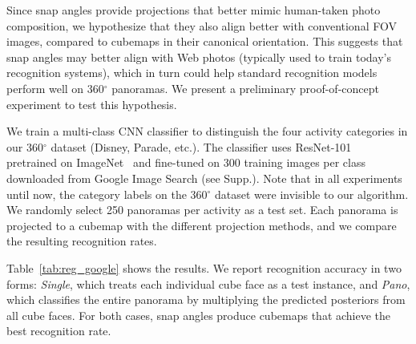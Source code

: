 Since snap angles provide projections that better mimic human-taken photo composition, we hypothesize that they also align better with conventional FOV images, compared to cubemaps in their canonical orientation.  This suggests that snap angles may better align with Web photos (typically used to train today's recognition systems), which in turn could help standard recognition models perform well on 360$^{\circ}$ panoramas.  We present a preliminary proof-of-concept experiment to test this hypothesis.



We train a multi-class CNN classifier to distinguish the four activity categories in our 360$^{\circ}$ dataset (Disney, Parade, etc.).  The classifier uses ResNet-101~\cite{he2016deep} pretrained on ImageNet~\cite{russakovsky2015imagenet} and fine-tuned on 300 training images per class downloaded from Google Image Search (see Supp.).
Note that in all experiments until now, the category labels on the 360$^{\circ}$ dataset were invisible to our algorithm.
We randomly select 250 panoramas per activity as a test set.   Each panorama is projected to a cubemap with the different projection methods, and we compare the resulting recognition rates.



Table~\ref{tab:reg_google} shows the results.  We report recognition accuracy in two forms: \emph{Single}, which 
treats each individual cube face as a test instance, and \emph{Pano}, which classifies the entire panorama by multiplying the predicted posteriors from all cube faces.  For both cases, snap angles produce cubemaps that achieve the best recognition rate. 






